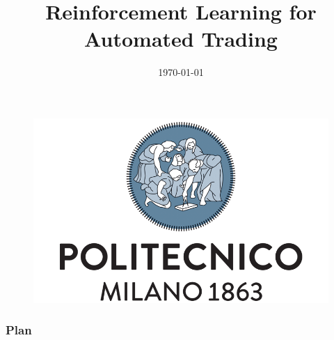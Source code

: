 \documentclass{beamer}
\title[]{Reinforcement Learning for Automated Trading}
\author[P.\,Necchi]
{%
  \texorpdfstring{
    \begin{columns}%
      \column{1\linewidth}
      \centering
      Pierpaolo Necchi\\
      \href{mailto:pierpaolo.necchi@gmail.com}{pierpaolo.necchi@gmail.com}
    \end{columns}
  }
  {Pierpaolo Necchi}
}
\institute[Polimi] %
{%
}
\date{\today}
\begin{document}
\begin{frame}[plain]
	\begin{figure}[htpb]
		\centering
		\includegraphics[width=0.5\linewidth]{Images/polimi_name}
	\end{figure}
	\titlepage
\end{frame}


\begin{frame}
\frametitle{Plan} %
\tableofcontents %
\end{frame}









\appendix
\backupbegin

\begin{frame}
\frametitle{\refname}
\nocite{*}


\end{frame}

\backupend
\end{document}
